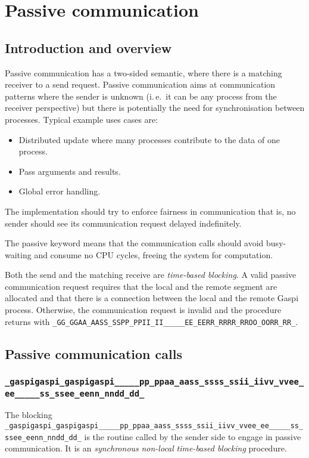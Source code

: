\documentclass[a4paper]{article}
\makeatletter
\newlength{\st}\setlength{\st}{0pt}
\newcommand{\zerowsep}{\hskip 0pt plus 0.1pt minus 0.1pt}
\newcommand{\ZSEP}[1]{\ifx#1\@@@EOZ@@@\let\next\relax\else\ifx#1\_#1\zerowsep\else#1\fi\let\next\ZSEP\fi\next}
\newcommand{\zsep}[1]{\ZSEP{}#1\@@@EOZ@@@}
\newcommand{\gaspiprefix}{gaspi}
\newcommand{\GASPI}{{\sc Gaspi}}
\newcommand{\function}[1]{{\tt #1}}
\newcommand{\gaspifunction}[1]{\function{\protect\zsep{\gaspiprefix\_#1}}}
\newcommand{\GASPIGERR}{{\tt\protect\zsep{GASPI\_ERROR}}}
\newcommand{\gaspisemantic}[1]{{\emph{#1}}}
\makeatother
\begin{document}
\section{Passive communication}

\subsection{Introduction and overview}

Passive communication has a two-sided semantic, where there is a
matching receiver to a send request. Passive communication aims at
communication patterns where the sender is unknown (i.\,e.\ it can be any
process from the receiver perspective) but there is potentially the need
for synchronisation between processes. Typical example uses cases are:

\begin{itemize}
\item Distributed update where many processes contribute to the data of
  one process.
\item Pass arguments and results.
\item Global error handling.
\end{itemize}

The implementation should try to enforce fairness in communication
that is, no sender should see its communication request delayed
indefinitely.

The passive keyword means that the communication calls should avoid
busy-waiting and consume no CPU cycles, freeing the system for
computation.

Both the send and the matching receive are \gaspisemantic{time-based
  blocking}. A valid passive communication request requires that the
local and the remote segment are allocated and that there is a
connection between the local and the remote \GASPI{}
process. Otherwise, the communication request is invalid and the
procedure returns with \GASPIGERR{}.

\subsection{Passive communication calls}

\subsubsection{\gaspifunction{passive\_send}}

The blocking \gaspifunction{passive\_send} is the routine called by
the sender side to engage in passive communication. It is an
\gaspisemantic{synchronous} \gaspisemantic{non-local}
\gaspisemantic{time-based blocking} procedure.
\end{document}
